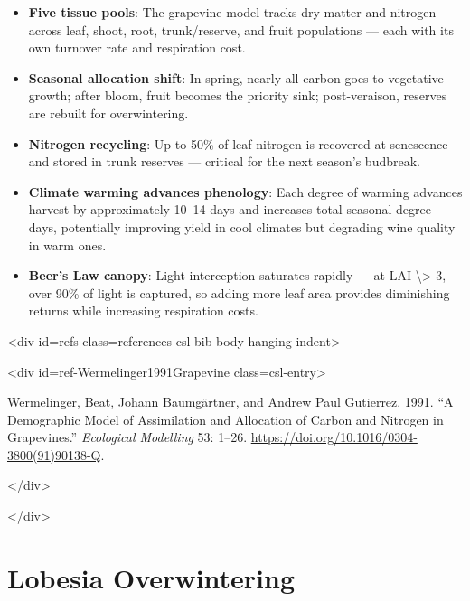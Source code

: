 \begin{itemize}
\item[1. ] \textbf{Five tissue pools}: The grapevine model tracks dry matter and  nitrogen across leaf, shoot, root, trunk/reserve, and fruit  populations — each with its own turnover rate and respiration cost.


\item[2. ] \textbf{Seasonal allocation shift}: In spring, nearly all carbon goes to  vegetative growth; after bloom, fruit becomes the priority sink;  post-veraison, reserves are rebuilt for overwintering.


\item[3. ] \textbf{Nitrogen recycling}: Up to 50\% of leaf nitrogen is recovered at  senescence and stored in trunk reserves — critical for the next  season’s budbreak.


\item[4. ] \textbf{Climate warming advances phenology}: Each degree of warming  advances harvest by approximately 10–14 days and increases total  seasonal degree-days, potentially improving yield in cool climates  but degrading wine quality in warm ones.


\item[5. ] \textbf{Beer’s Law canopy}: Light interception saturates rapidly — at LAI  {\textbackslash}> 3, over 90\% of light is captured, so adding more leaf area  provides diminishing returns while increasing respiration costs.

\end{itemize}


<div id={\textquotedbl}refs{\textquotedbl} class={\textquotedbl}references csl-bib-body hanging-indent{\textquotedbl}>



<div id={\textquotedbl}ref-Wermelinger1991Grapevine{\textquotedbl} class={\textquotedbl}csl-entry{\textquotedbl}>



Wermelinger, Beat, Johann Baumgärtner, and Andrew Paul Gutierrez. 1991. “A Demographic Model of Assimilation and Allocation of Carbon and Nitrogen in Grapevines.” \emph{Ecological Modelling} 53: 1–26. \href{https://doi.org/10.1016/0304-3800(91)90138-Q}{https://doi.org/10.1016/0304-3800(91)90138-Q}.



</div>



</div>



\chapter{Lobesia Overwintering}


